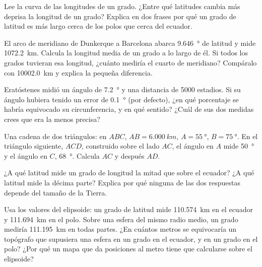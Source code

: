\begin{exercise}[$\star\star$]\label{exo:g10:measuring-the-earth:10}
Lee la curva de las longitudes de un grado. ¿Entre qué latitudes cambia más
deprisa la longitud de un grado? Explica en dos frases por qué un grado de
latitud es más largo cerca de los polos que cerca del ecuador.
\end{exercise}

\begin{exercise}[$\star\star$]\label{exo:g10:measuring-the-earth:11}
El arco de meridiano de Dunkerque a Barcelona abarca \qty{9.646}{\degree}
de latitud y mide \qty{1072.2}{km}. Calcula la longitud media de un grado a
lo largo de él. Si todos los grados tuvieran esa longitud, ¿cuánto mediría
el cuarto de meridiano? Compáralo con \qty{10002.0}{km} y explica la pequeña
diferencia.
\end{exercise}

\begin{exercise}[$\star\star\star$]\label{exo:g10:measuring-the-earth:12}
Eratóstenes midió un ángulo de \qty{7.2}{\degree} y una distancia de 5000
estadios. Si su ángulo hubiera tenido un error de \qty{0.1}{\degree} (por
defecto), ¿en qué porcentaje se habría equivocado su circunferencia, y en
qué sentido? ¿Cuál de sus dos medidas crees que era la menos precisa?
\end{exercise}

\begin{exercise}[$\star\star\star$]\label{exo:g10:measuring-the-earth:13}
Una cadena de dos triángulos: en $ABC$, $AB = \qty{6.000}{km}$,
$A = \qty{55}{\degree}$, $B = \qty{75}{\degree}$. En el triángulo siguiente,
$ACD$, construido sobre el lado $AC$, el ángulo en $A$ mide
\qty{50}{\degree} y el ángulo en $C$, \qty{68}{\degree}. Calcula $AC$ y
después $AD$.
\end{exercise}

\begin{exercise}[$\star\star\star$]\label{exo:g10:measuring-the-earth:14}
¿A qué latitud mide un grado de longitud la mitad que sobre el ecuador? ¿A
qué latitud mide la décima parte? Explica por qué ninguna de las dos
respuestas depende del tamaño de la Tierra.
\end{exercise}

\begin{exercise}[$\star\star\star$]\label{exo:g10:measuring-the-earth:15}
Usa los valores del elipsoide: un grado de latitud mide \qty{110.574}{km} en
el ecuador y \qty{111.694}{km} en el polo. Sobre una esfera del mismo radio
medio, un grado mediría \qty{111.195}{km} en todas partes. ¿En cuántos
metros se equivocaría un topógrafo que supusiera una esfera en un grado en
el ecuador, y en un grado en el polo? ¿Por qué un mapa que da posiciones al
metro tiene que calcularse sobre el elipsoide?
\end{exercise}

